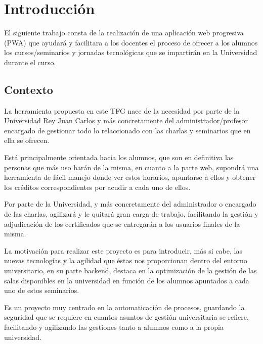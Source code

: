 \documentclass[a4paper, 12pt]{book}
\begin{document}

\cleardoublepage
\chapter{Introducción}
\label{sec:intro} %

El siguiente trabajo consta de la realización de una aplicación web progresiva (PWA) que ayudará y facilitara a los docentes el proceso de ofrecer a los alumnos los cursos/seminarios y jornadas tecnológicas que se impartirán en la Universidad durante el curso.


\section{Contexto}
\label{sec:contexto}
La herramienta propuesta en este TFG nace de la necesidad por parte de la Universidad Rey Juan Carlos y más concretamente del administrador/profesor encargado de gestionar todo lo relaccionado con las charlas y seminarios que en ella se ofrecen.

Está principalmente orientada hacia los alumnos, que son en definitiva las personas que más uso harán de la misma, en cuanto a la parte web, supondrá una herramienta de fácil manejo donde ver estos horarios, apuntarse a ellos y obtener los créditos correspondientes por acudir a cada uno de ellos.

Por parte de la Universidad, y más concretamente del administrador o encargado de las charlas, agilizará y le quitará gran carga de trabajo, facilitando la gestión y adjudicación de los certificados que se entregarán a los usuarios finales de la misma.

La motivación para realizar este proyecto es para introducir, más si cabe, las nuevas tecnologías y la agilidad que éstas nos proporcionan dentro del entorno universitario, en su parte backend, destaca en la optimización de la gestión de las salas disponibles en la universidad en función de los alumnos apuntados a cada uno de estos seminarios.

Es un proyecto muy centrado en la automaticación de procesos, guardando la seguridad que se requiere en cuantos asuntos de gestión universitaria se refiere, facilitando y agilizando las gestiones tanto a alumnos como a la propia universidad.
\end{document}
